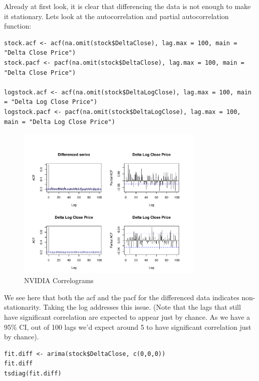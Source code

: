Already at first look, it is clear that differencing the data is not enough to make it stationary. Lets look at the autocorrelation and partial autocorrelation function:

\begin{lstlisting}
stock.acf <- acf(na.omit(stock$DeltaClose), lag.max = 100, main = "Delta Close Price")
stock.pacf <- pacf(na.omit(stock$DeltaClose), lag.max = 100, main = "Delta Close Price")

logstock.acf <- acf(na.omit(stock$DeltaLogClose), lag.max = 100, main = "Delta Log Close Price")
logstock.pacf <- pacf(na.omit(stock$DeltaLogClose), lag.max = 100, main = "Delta Log Close Price")
\end{lstlisting}

\begin{figure}[H]
\centering
\includegraphics[width=0.8\textwidth]{plots/NVD2.pdf}
\caption{NVIDIA Correlograms}
\end{figure}

We see here that both the acf and the pacf for the differenced data indicates non-stationarity. Taking the log addresses this issue. (Note that the lags that still have significant correlation are expected to appear just by chance. As we have a 95\% CI, out of 100 lags we'd expect around 5 to have significant correlation just by chance). 

\begin{lstlisting}
fit.diff <- arima(stock$DeltaClose, c(0,0,0))
fit.diff
tsdiag(fit.diff)

\end{lstlisting}

